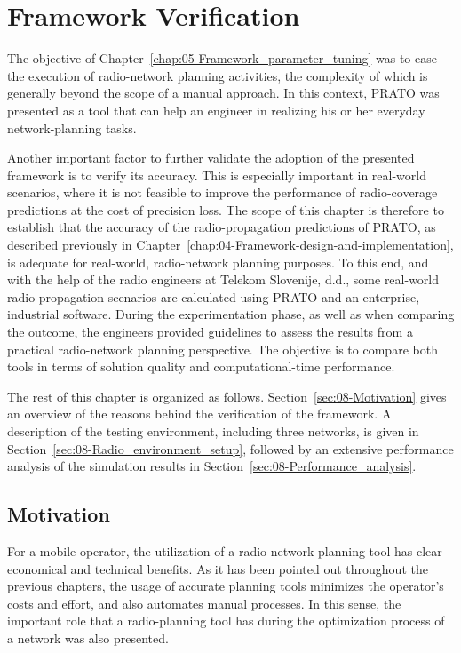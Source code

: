 
\chapter{Framework Verification \label{chap:08-Real-world_network_planning}}


\noindent The objective of Chapter~\ref{chap:05-Framework_parameter_tuning}
was to ease the execution of radio-network planning activities, the
complexity of which is generally beyond the scope of a manual approach.
In this context, PRATO was presented as a tool that can help an engineer
in realizing his or her everyday network-planning tasks.

Another important factor to further validate the adoption of the presented
framework is to verify its accuracy. This is especially important
in real-world scenarios, where it is not feasible to improve the performance
of radio-coverage predictions at the cost of precision loss. The scope
of this chapter is therefore to establish that the accuracy of the
radio-propagation predictions of PRATO, as described previously in
Chapter~\ref{chap:04-Framework-design-and-implementation}, is adequate
for real-world, radio-network planning purposes. To this end, and
with the help of the radio engineers at Telekom Slovenije, d.d., some
real-world radio-propagation scenarios are calculated using PRATO
and an enterprise, industrial software. During the experimentation
phase, as well as when comparing the outcome, the engineers provided
guidelines to assess the results from a practical radio-network planning
perspective. The objective is to compare both tools in terms of solution
quality and computational-time performance. 

The rest of this chapter is organized as follows. Section~\ref{sec:08-Motivation}
gives an overview of the reasons behind the verification of the framework.
A description of the testing environment, including three networks,
is given in Section~\ref{sec:08-Radio_environment_setup}, followed
by an extensive performance analysis of the simulation results in
Section~\ref{sec:08-Performance_analysis}.


\section{Motivation \label{sec:08-Motivation}}

For a mobile operator, the utilization of a radio-network planning
tool has clear economical and technical benefits. As it has been pointed
out throughout the previous chapters, the usage of accurate planning
tools minimizes the operator's costs and effort, and also automates
manual processes. In this sense, the important role that a radio-planning
tool has during the optimization process of a network was also presented. 

